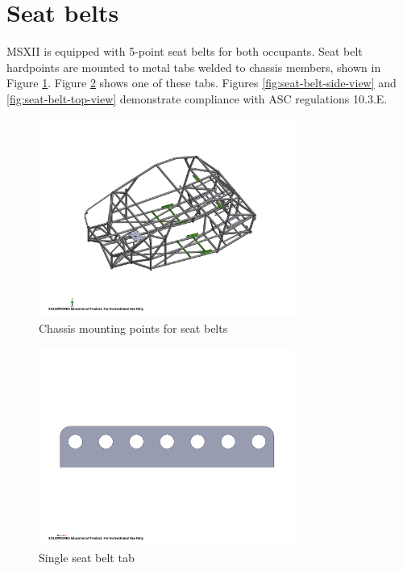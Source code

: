 \documentclass[10pt]{article}
\begin{document}
\section{Seat belts}
MSXII is equipped with 5-point seat belts for both occupants. Seat belt hardpoints are mounted to metal tabs welded to chassis members, shown in Figure \ref{fig:seat-belt-tab-positions}. Figure \ref{fig:seat-belt-tab} shows one of these tabs. Figures \ref{fig:seat-belt-side-view} and \ref{fig:seat-belt-top-view} demonstrate compliance with ASC regulations 10.3.E.

\begin{figure}
\centering
\includegraphics[width=0.75\textwidth]{figures/seat-belt-tab-positions}
\caption{Chassis mounting points for seat belts}
\label{fig:seat-belt-tab-positions}
\end{figure}

\begin{figure}
\centering
\includegraphics[width=0.75\textwidth]{figures/seat-belt-tab}
\caption{Single seat belt tab}
\label{fig:seat-belt-tab}
\end{figure}
\end{document}
